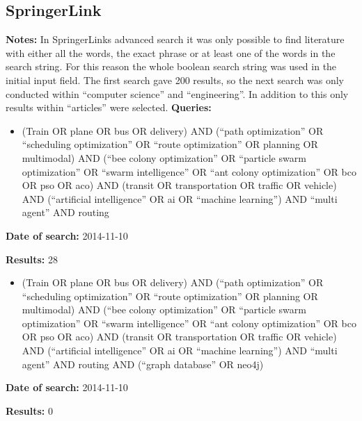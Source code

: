 \subsection{SpringerLink}
\textbf{Notes:} In SpringerLinks advanced search it was only possible to find literature with either all the words, the exact phrase or at least one of the words in the search string. For this reason the whole boolean search string was used in the initial input field. The first search gave 200 results, so the next search was only conducted within ``computer science'' and ``engineering''. In addition to this only results within ``articles'' were selected.
\newline
\newline
\textbf{Queries:}
\begin{itemize}
\item (Train OR plane OR bus OR delivery) AND (``path optimization'' OR ``scheduling optimization'' OR ``route optimization'' OR planning OR multimodal) AND (``bee colony optimization'' OR ``particle swarm optimization'' OR ``swarm intelligence'' OR ``ant colony optimization'' OR bco OR pso OR aco) AND (transit OR transportation OR traffic OR vehicle) AND (``artificial intelligence'' OR ai OR ``machine learning'') AND ``multi agent'' AND routing
\end{itemize}
\par \textbf{Date of search:} 2014-11-10 
\par \textbf{Results:} 28
\begin{itemize}
\item (Train OR plane OR bus OR delivery) AND (``path optimization'' OR ``scheduling optimization'' OR ``route optimization'' OR planning OR multimodal) AND (``bee colony optimization'' OR ``particle swarm optimization'' OR ``swarm intelligence'' OR ``ant colony optimization'' OR bco OR pso OR aco) AND (transit OR transportation OR traffic OR vehicle) AND (``artificial intelligence'' OR ai OR ``machine learning'') AND ``multi agent'' AND routing AND (``graph database'' OR neo4j)
\end{itemize}
\par \textbf{Date of search:} 2014-11-10 
\par \textbf{Results:} 0


